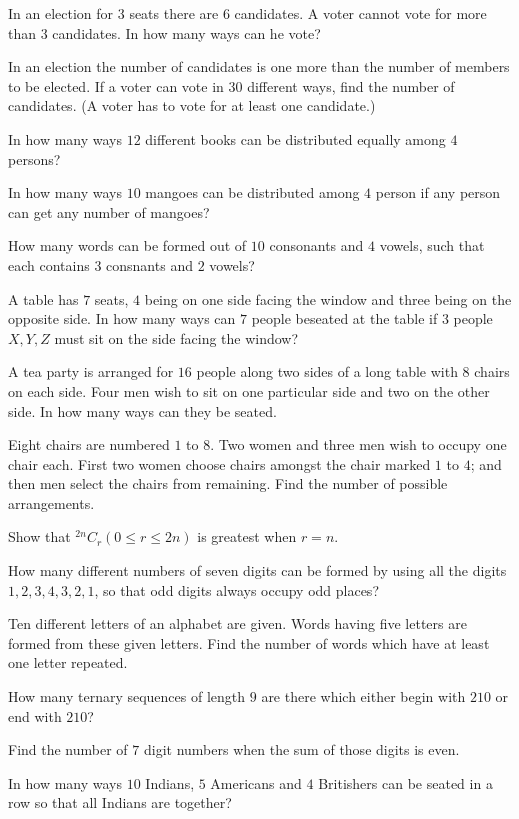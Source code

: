 \item In an election for $3$ seats there are $6$ candidates. A voter cannot vote for more than $3$ candidates. In how many ways can
  he vote?
\item In an election the number of candidates is one more than the number of members to be elected. If a voter can vote in $30$
  different ways, find the number of candidates. (A voter has to vote for at least one candidate.)
\item In how many ways $12$ different books can be distributed equally among $4$ persons?
\item In how many ways $10$ mangoes can be distributed among $4$ person if any person can get any number of mangoes?
\item How many words can be formed out of $10$ consonants and $4$ vowels, such that each contains $3$ consnants and $2$ vowels?
\item A table has $7$ seats, $4$ being on one side facing the window and three being on the opposite side. In how many ways can $7$
  people beseated at the table if $3$ people $X, Y, Z$ must sit on the side facing the window?
\item A tea party is arranged for $16$ people along two sides of a long table with $8$ chairs on each side. Four men wish to sit on
  one particular side and two on the other side. In how many ways can they be seated.
\item Eight chairs are numbered $1$ to $8$. Two women and three men wish to occupy one chair each. First two women choose chairs
  amongst the chair marked $1$ to $4$; and then men select the chairs from remaining. Find the number of possible arrangements.
\item Show that ${}^{2n}C_r (0\leq r\leq 2n)$ is greatest when $r = n$.
\item How many different numbers of seven digits can be formed by using all the digits $1, 2, 3, 4, 3, 2, 1$,
  so that odd digits always occupy odd places?
\item Ten different letters of an alphabet are given. Words having five letters are formed from these given
  letters. Find the number of words which have at least one letter repeated.
\item How many ternary sequences of length $9$ are there which either begin with $210$ or end with $210$?
\item Find the number of $7$ digit numbers when the sum of those digits is even.
\item In how many ways $10$ Indians, $5$ Americans and $4$ Britishers can be seated in a row so that all Indians are together?
